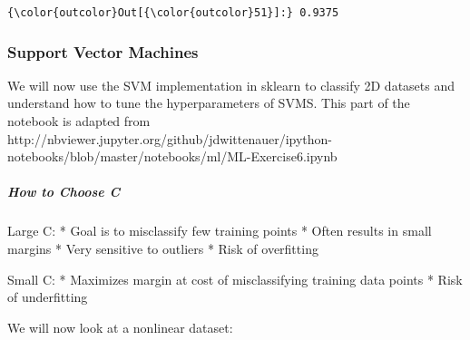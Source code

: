 \documentclass[11pt]{article}
\begin{document}
\begin{Verbatim}[commandchars=\\\{\}]
{\color{outcolor}Out[{\color{outcolor}51}]:} 0.9375
\end{Verbatim}
            
    \subsubsection{Support Vector Machines}\label{support-vector-machines}

We will now use the SVM implementation in sklearn to classify 2D
datasets and understand how to tune the hyperparameters of SVMS. This
part of the notebook is adapted from
http://nbviewer.jupyter.org/github/jdwittenauer/ipython-notebooks/blob/master/notebooks/ml/ML-Exercise6.ipynb

    \subparagraph{How to Choose C}\label{how-to-choose-c}

Large C: * Goal is to misclassify few training points * Often results in
small margins * Very sensitive to outliers * Risk of overfitting

Small C: * Maximizes margin at cost of misclassifying training data
points * Risk of underfitting

We will now look at a nonlinear dataset:
\end{document}
